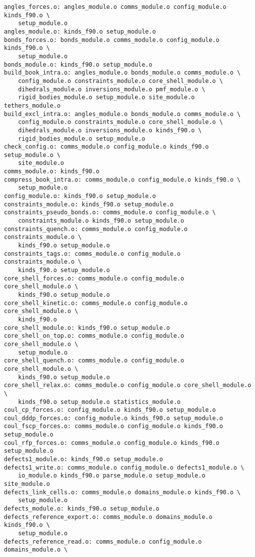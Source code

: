 \begin{verbatim}
angles_forces.o: angles_module.o comms_module.o config_module.o kinds_f90.o \
	setup_module.o
angles_module.o: kinds_f90.o setup_module.o
bonds_forces.o: bonds_module.o comms_module.o config_module.o kinds_f90.o \
	setup_module.o
bonds_module.o: kinds_f90.o setup_module.o
build_book_intra.o: angles_module.o bonds_module.o comms_module.o \
	config_module.o constraints_module.o core_shell_module.o \
	dihedrals_module.o inversions_module.o pmf_module.o \
	rigid_bodies_module.o setup_module.o site_module.o tethers_module.o
build_excl_intra.o: angles_module.o bonds_module.o comms_module.o \
	config_module.o constraints_module.o core_shell_module.o \
	dihedrals_module.o inversions_module.o kinds_f90.o \
	rigid_bodies_module.o setup_module.o
check_config.o: comms_module.o config_module.o kinds_f90.o setup_module.o \
	site_module.o
comms_module.o: kinds_f90.o
compress_book_intra.o: comms_module.o config_module.o kinds_f90.o \
	setup_module.o
config_module.o: kinds_f90.o setup_module.o
constraints_module.o: kinds_f90.o setup_module.o
constraints_pseudo_bonds.o: comms_module.o config_module.o \
	constraints_module.o kinds_f90.o setup_module.o
constraints_quench.o: comms_module.o config_module.o constraints_module.o \
	kinds_f90.o setup_module.o
constraints_tags.o: comms_module.o config_module.o constraints_module.o \
	kinds_f90.o setup_module.o
core_shell_forces.o: comms_module.o config_module.o core_shell_module.o \
	kinds_f90.o setup_module.o
core_shell_kinetic.o: comms_module.o config_module.o core_shell_module.o \
	kinds_f90.o
core_shell_module.o: kinds_f90.o setup_module.o
core_shell_on_top.o: comms_module.o config_module.o core_shell_module.o \
	setup_module.o
core_shell_quench.o: comms_module.o config_module.o core_shell_module.o \
	kinds_f90.o setup_module.o
core_shell_relax.o: comms_module.o config_module.o core_shell_module.o \
	kinds_f90.o setup_module.o statistics_module.o
coul_cp_forces.o: config_module.o kinds_f90.o setup_module.o
coul_dddp_forces.o: config_module.o kinds_f90.o setup_module.o
coul_fscp_forces.o: comms_module.o config_module.o kinds_f90.o setup_module.o
coul_rfp_forces.o: comms_module.o config_module.o kinds_f90.o setup_module.o
defects1_module.o: kinds_f90.o setup_module.o
defects1_write.o: comms_module.o config_module.o defects1_module.o \
	io_module.o kinds_f90.o parse_module.o setup_module.o site_module.o
defects_link_cells.o: comms_module.o domains_module.o kinds_f90.o \
	setup_module.o
defects_module.o: kinds_f90.o setup_module.o
defects_reference_export.o: comms_module.o domains_module.o kinds_f90.o \
	setup_module.o
defects_reference_read.o: comms_module.o config_module.o domains_module.o \

\end{verbatim}
